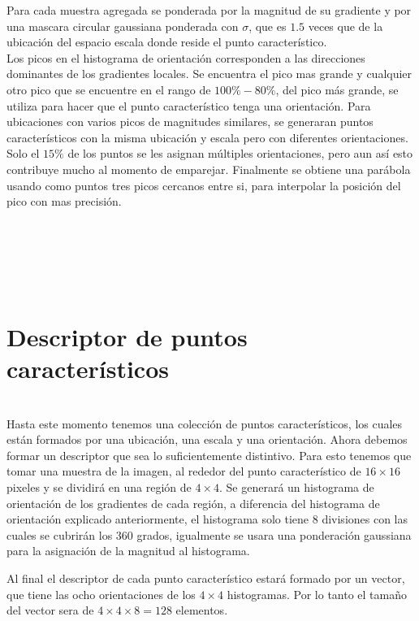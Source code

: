 		Para cada muestra agregada se ponderada por la magnitud de su gradiente y por una mascara circular gaussiana ponderada con $\sigma$, que es $1.5$ veces que de la ubicación del espacio escala donde reside el punto característico.\\
		\pagebreak
		Los picos en el histograma de orientación corresponden a las direcciones dominantes de los gradientes locales. Se encuentra el pico mas grande y cualquier otro pico que se encuentre en el rango de $100\% - 80\%$, del pico más grande, se utiliza para hacer que el punto característico tenga una orientación. Para ubicaciones con varios picos de magnitudes similares, se generaran puntos característicos con la misma ubicación y escala pero con diferentes orientaciones. Solo el $15\%$ de los puntos se les asignan múltiples orientaciones, pero aun así esto contribuye mucho al momento de emparejar. Finalmente se obtiene una parábola usando como puntos tres picos cercanos entre si, para interpolar la posición del pico con mas precisión.  \\\\\\\\\\\ \pagebreak
	
	
	

		

\section{Descriptor de puntos característicos} \hfill \\

		
	Hasta este momento tenemos una colección de puntos característicos, los cuales están formados por una ubicación, una escala y una orientación. Ahora debemos formar un descriptor que sea lo suficientemente distintivo. Para esto tenemos que tomar una muestra de la imagen, al rededor del punto característico de $16\times16$ pixeles y se dividirá en una región de $4 \times 4$. Se generará un histograma de orientación de los gradientes de cada región, a diferencia del histograma de orientación explicado anteriormente, el histograma solo tiene 8 divisiones con las cuales se cubrirán los 360 grados, igualmente se usara una ponderación gaussiana para la asignación de la magnitud al histograma.
		
	Al final el descriptor de cada punto característico estará formado por un vector, que tiene las ocho orientaciones de los $4\times4$ histogramas. Por lo tanto el tamaño del vector sera de $4\times4\times8 = 128$ elementos. 
 	

